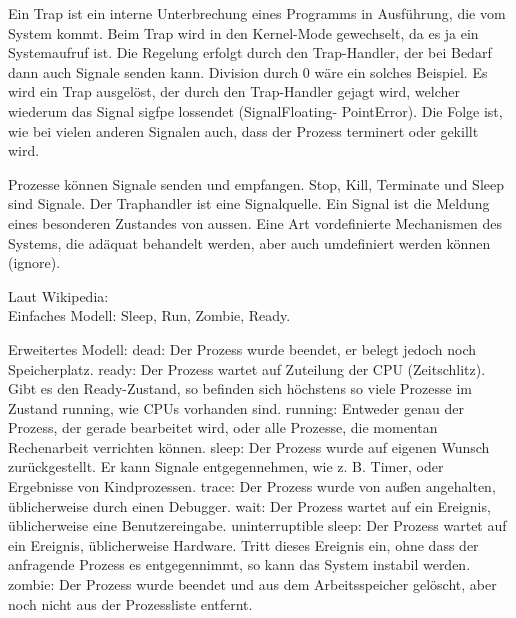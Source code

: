 \begin{answer}
Ein Trap ist ein interne Unterbrechung eines Programms in Ausführung, die vom System
kommt. Beim Trap wird in den Kernel-Mode gewechselt, da es ja ein Systemaufruf ist.
Die Regelung erfolgt durch den Trap-Handler, der bei Bedarf dann auch Signale senden
kann. Division durch 0 wäre ein solches Beispiel. Es wird ein Trap ausgelöst, der durch den
Trap-Handler gejagt wird, welcher wiederum das Signal sigfpe lossendet (SignalFloating-
PointError). Die Folge ist, wie bei vielen anderen Signalen auch, dass der Prozess terminert
oder gekillt wird.
\end{answer}

\begin{answer}
Prozesse können Signale senden und empfangen. Stop, Kill, Terminate und Sleep sind
Signale. Der Traphandler ist eine Signalquelle. Ein Signal ist die Meldung eines besonderen
Zustandes von aussen. Eine Art vordefinierte Mechanismen des Systems, die adäquat
behandelt werden, aber auch umdefiniert werden können (ignore).
\end{answer}

\begin{answer}
Laut Wikipedia:\\
Einfaches Modell:
Sleep, Run, Zombie, Ready.

Erweitertes Modell:
dead: Der Prozess wurde beendet, er belegt jedoch noch Speicherplatz.
ready: Der Prozess wartet auf Zuteilung der CPU (Zeitschlitz). Gibt es den Ready-Zustand, so befinden sich höchstens so viele Prozesse im Zustand running, wie CPUs vorhanden sind.
running: Entweder genau der Prozess, der gerade bearbeitet wird, oder alle Prozesse, die momentan Rechenarbeit verrichten können.
sleep: Der Prozess wurde auf eigenen Wunsch zurückgestellt. Er kann Signale entgegennehmen, wie z. B. Timer, oder Ergebnisse von Kindprozessen.
trace: Der Prozess wurde von außen angehalten, üblicherweise durch einen Debugger.
wait: Der Prozess wartet auf ein Ereignis, üblicherweise eine Benutzereingabe.
uninterruptible sleep: Der Prozess wartet auf ein Ereignis, üblicherweise Hardware. Tritt dieses Ereignis ein, ohne dass der anfragende Prozess es entgegennimmt, so kann das System instabil werden.
zombie: Der Prozess wurde beendet und aus dem Arbeitsspeicher gelöscht, aber noch nicht aus der Prozessliste entfernt.
\end{answer}

